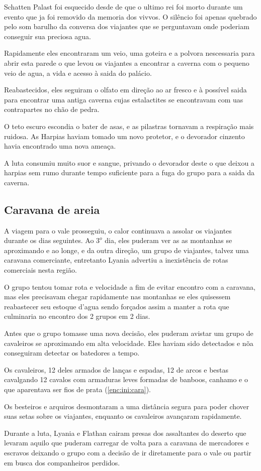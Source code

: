 Schatten Palast foi esquecido desde de que o ultimo rei foi morto
durante um evento que ja foi removido da memoria dos vivvos.
O sil\^encio foi apenas quebrado pelo som barulho da conversa dos viajantes
que se perguntavam onde poderiam conseguir sua preciosa agua.

Rapidamente eles encontraram um veio, uma goteira e a polvora nescessaria
para abrir esta parede o que levou os viajantes a encontrar a caverna com o pequeno
veio de agua, a vida e acesso \`a saida do pal\'acio.

Reabastecidos, eles seguiram o olfato em dire\c{c}\~ao ao ar fresco e \`a
poss\'ivel saida para encontrar uma antiga caverna cujas estalactites
se encontravam com uas contrapartes no ch\~ao de pedra.

O teto escuro escondia o bater de asas, e as pilastras tornavam
a respira\c{c}\~ao mais ruidosa. As Harpias haviam tomado um novo
protetor, e o devorador cinzento havia encontrado uma nova amea\c{c}a.

A luta consumiu muito suor e sangue, privando o devorador deste
o que deixou a harpias sem rumo durante tempo suficiente para a fuga do
grupo para a saida da caverna.

\subsection{Caravana de areia}
A viagem para o vale prosseguiu, o calor continuava a assolar os viajantes
durante os dias seguintes.
Ao \(3^o\) dia, eles puderam ver as as montanhas se aproximando e ao longe,
e da outra dire\c{c}\~ao, um grupo de viajantes, talvez uma caravana comerciante,
entretanto Lyania advertiu a inexist\^encia de rotas comerciais nesta regi\~ao.

O grupo tentou tomar rota e velocidade a fim de evitar encontro com a
caravana, mas eles precisavam chegar rapidamente nas montanhas
se eles quisessem reabastecer seu estoque d'agua sendo for\c{c}ados assim a manter
a rota que culminaria no encontro dos 2 grupos em 2 dias.

Antes que o grupo tomasse uma nova decis\~ao, eles puderam avistar um grupo de
cavaleiros se aproximando em alta velocidade. Eles haviam sido detectados
e n\~oa conseguiram detectar os batedores a tempo.

Os cavaleiros, 12 deles armados de lan\c{c}as e espadas, 12 de arcos e bestas
cavalgando 12 cavalos com armaduras leves formadas de banboos, canhamo e
o que aparentava ser fios de prata (\ref{enc:ini:cara}).

Os besteiros e arquiros desmontaram a uma dist\^ancia segura para poder
chover suas setas sobre os viajantes, enquanto os cavaleiros avan\c{c}aram
rapidamente.

Durante a luta, Lyania e Flathan cairam presas dos assaltantes
do deserto que levaram aquilo que puderam carregar de volta para a
caravana de mercadores e escravos deixando o grupo com a decis\~ao de
ir diretamente para o vale ou partir em busca dos companheiros perdidos.
